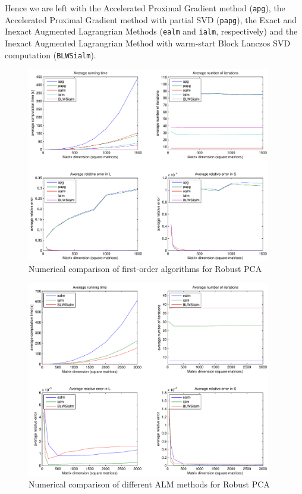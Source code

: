 \documentclass{../../common/projectreport}
\begin{document}
Hence we are left with the Accelerated Proximal Gradient method (\texttt{apg}), the Accelerated Proximal Gradient method with partial SVD (\texttt{papg}), the Exact and Inexact Augmented Lagrangrian Methods (\texttt{ealm} and \texttt{ialm}, respectively) and the Inexact Augmented Lagrangrian Method with warm-start Block Lanczos SVD computation (\texttt{BLWSialm}).


%
\begin{figure}[htbp]
\centering
\includegraphics[width=0.95\textwidth]{../figures/ALG_comparison}
\caption{Numerical comparison of first-order algorithms for Robust PCA}
\label{Algorithms:Discussion:NumComp:ALG:figure}
\end{figure}











%
\begin{figure}[htbp]
\centering
\includegraphics[width=0.95\textwidth]{../figures/ALM_comparison}
\caption{Numerical comparison of different ALM methods for Robust PCA}
\label{Algorithms:Discussion:NumComp:ALM:figure}
\end{figure}
\end{document}
